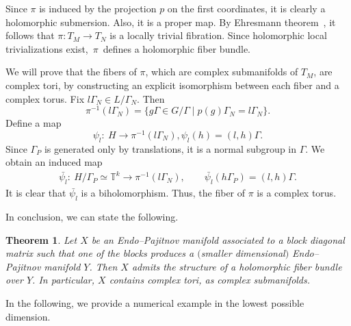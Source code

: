 \documentclass[pdftex]{sigma}
\newcommand{\6}{\partial}
\numberwithin{equation}{section}
\newtheorem{Theorem}{Theorem}[section]
\begin{document}
Since $\pi$ is induced by the projection $p$ on the first coordinates, it is clearly a holomorphic submersion. Also, it is a proper map. By Ehresmann theorem~\cite[Corollary 6.2.3]{huy}, it follows that $\pi\colon T_M \longrightarrow T_N$ is a locally trivial fibration. Since holomorphic local trivializations exist,~$\pi$~defines a holomorphic fiber bundle.

We will prove that the fibers of $\pi$, which are complex submanifolds of $T_M$, are complex tori, by constructing an explicit isomorphism between each fiber and a complex torus.
Fix $l\Gamma_N \in L/ \Gamma_N$. Then
\[\pi^{-1}(l\Gamma_N)=\{g\Gamma \in G/ \Gamma \mid p(g)\Gamma_N=l \Gamma_N\}.\]
Define a map
\[\psi_l\colon \ H \longrightarrow \pi^{-1}(l \Gamma_N), \psi_l(h)=(l,h)\Gamma.\]
Since $\Gamma_P$ is generated only by translations, it is a normal subgroup in $\Gamma$.
We obtain an induced map
\begin{gather*}
\bar{\psi_l}\colon\ H/\Gamma_P \simeq \mathbb T^{k} \longrightarrow \pi^{-1}(l \Gamma_N),\qquad
\bar{\psi_l}(h \Gamma_P)=(l,h)\Gamma.
\end{gather*}
It is clear that $\bar{\psi_l}$ is a biholomorphism.
Thus, the fiber of $\pi$ is a complex torus.

In conclusion, we can state the following.

\begin{Theorem}\label{ex_th}
Let $X$ be an Endo--Pajitnov manifold associated to a block diagonal matrix such that one of the blocks produces a $($smaller dimensional$)$ Endo--Pajitnov manifold $Y$. Then $X$ admits the structure of a holomorphic fiber bundle over $Y$. In particular, $X$ contains complex tori, as complex submanifolds.
\end{Theorem}

In the following, we provide a numerical example in the lowest possible dimension.
\end{document}

